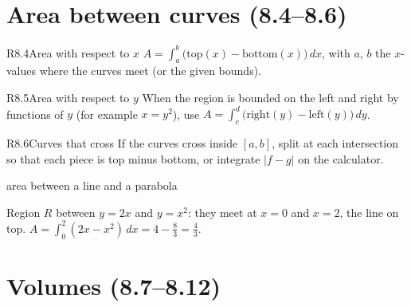 \documentclass{apcalc}
\begin{document}
\section{Area between curves (8.4--8.6)}

\begin{rulebox}{R8.4}{Area with respect to $x$}
$\displaystyle A=\int_a^b\big(\text{top}(x)-\text{bottom}(x)\big)\,dx$, with $a$, $b$ the $x$-values where the curves meet (or the given bounds).
\end{rulebox}

\begin{rulebox}{R8.5}{Area with respect to $y$}
When the region is bounded on the left and right by functions of $y$ (for example $x=y^2$), use $\displaystyle A=\int_c^d\big(\text{right}(y)-\text{left}(y)\big)\,dy$.
\end{rulebox}

\begin{rulebox}{R8.6}{Curves that cross}
If the curves cross inside $[a,b]$, split at each intersection so that each piece is top minus bottom, or integrate $|f-g|$ on the calculator.
\end{rulebox}

\begin{example}{area between a line and a parabola}
\begin{center}
\end{center}
Region $R$ between $y=2x$ and $y=x^2$: they meet at $x=0$ and $x=2$, the line on top. $A=\int_0^2(2x-x^2)\,dx=4-\frac83=\frac43$. 
\end{example}

\section{Volumes (8.7--8.12)}
\end{document}
